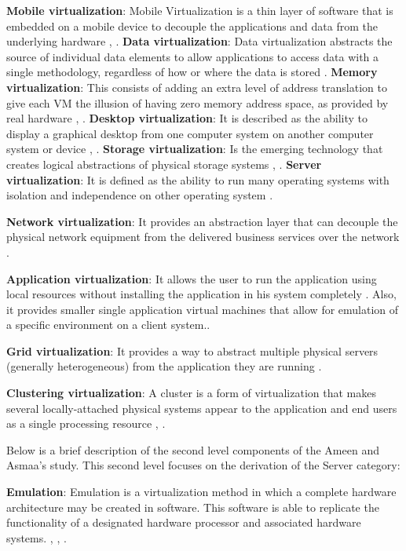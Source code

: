     \textbf{Mobile virtualization}: Mobile Virtualization is a thin layer of software that is embedded on a mobile device to decouple the applications and data from the underlying hardware \cite{Ameen2013}, \cite{VMware2018Website}. \textbf{Data virtualization}: Data virtualization abstracts the source of individual data elements to allow applications to access data with a single methodology, regardless of how or where the data is stored \cite{Mann2006}. \textbf{Memory virtualization}: This consists of adding an extra level of address translation to give each VM the illusion of having zero memory address space, as provided by real hardware \cite{Ameen2013}, \cite{Waldspurger2002}. \textbf{Desktop virtualization}: It is described as the ability to display a graphical desktop from one computer system on another computer system or device \cite{Ameen2013}, \cite{VonHagen2008}. \textbf{Storage virtualization}: Is the emerging technology that creates logical abstractions of physical storage systems \cite{Ameen2013}, \cite{Bigang2005}. \textbf{Server virtualization}: It is defined as the ability to run many operating systems with isolation and independence on other operating system \cite{Ameen2013}.
    
    \textbf{Network virtualization}: It provides an abstraction layer that can decouple the physical network equipment from the delivered business services over the network \cite{Annapareddy2011}.
    
    \textbf{Application virtualization}: It allows the user to run the application using local resources without installing the application in his system completely \cite{Annapareddy2011}. Also, it provides smaller single application virtual machines that allow for emulation of a specific environment on a client system.\cite{White2010}.
    
    \textbf{Grid virtualization}: It provides a way to abstract multiple physical servers (generally heterogeneous) from the application they are running \cite{Mann2006}.
    
    \textbf{Clustering virtualization}: A cluster is a form of virtualization that makes several locally-attached physical systems appear to the application and end users as a single processing resource \cite{Ameen2013}, \cite{Mann2006}.
    
    Below is a brief description of the second level components of the Ameen and Asmaa's study. This second level focuses on the derivation of the Server category:
    
    \textbf{Emulation}: Emulation is a virtualization method in which a complete hardware architecture may be created in software. This software is able to replicate the functionality of a designated hardware processor and associated hardware systems. \cite{Mann2006}, \cite{Chiueh2005}, \cite{VonHagen2008}.

